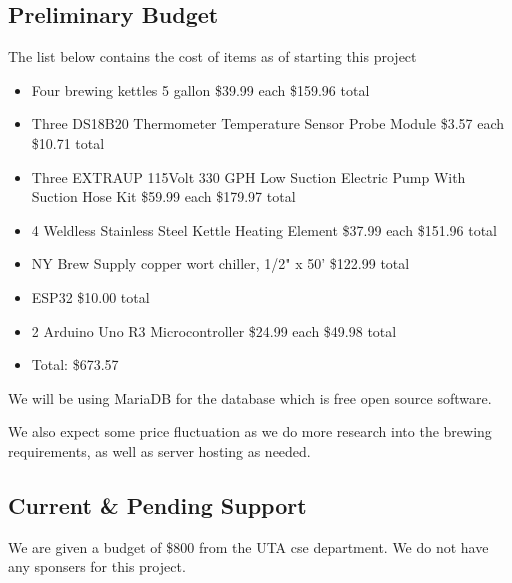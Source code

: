

\subsection{Preliminary Budget}
The list below contains the cost of items as of starting this project
\begin{itemize}
	\item Four brewing kettles 5 gallon \$39.99 each \$159.96 total
	\item Three DS18B20 Thermometer Temperature Sensor Probe Module \$3.57 each \$10.71 total
	\item Three EXTRAUP 115Volt 330 GPH Low Suction Electric Pump With Suction Hose Kit \$59.99 each \$179.97 total
	\item 4 Weldless Stainless Steel Kettle Heating Element \$37.99 each \$151.96 total
	\item NY Brew Supply copper wort chiller, 1/2" x 50' \$122.99 total
	\item ESP32 \$10.00 total
	\item 2 Arduino Uno R3 Microcontroller \$24.99 each \$49.98 total
	\item Total: \$673.57
\end{itemize}
We will be using MariaDB for the database which is free open source software. 

We also expect some price fluctuation as we do more research into the brewing requirements, as well as server hosting as needed.  

\subsection{Current \& Pending Support}
We are given a budget of \$800 from the UTA cse department. We do not have any sponsers for this project.